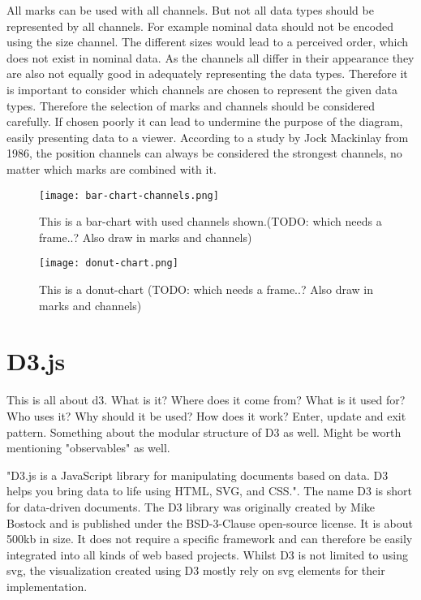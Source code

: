 All marks can be used with all channels. But not all data types should be represented by all channels. For example nominal data should not be encoded using the size channel. The different sizes would lead to a perceived order, which does not exist in nominal data. As the channels all differ in their appearance they are also not equally good in adequately representing the data types. Therefore it is important to consider which channels are chosen to represent the given data types. Therefore the selection of marks and channels should be considered carefully. If chosen poorly it can lead to undermine the purpose of the diagram, easily presenting data to a viewer. According to a study by Jock Mackinlay from 1986, the position channels can always be considered the strongest channels, no matter which marks are combined with it\cite{mackinlay1986automating}.


\begin{figure}
    \label{fig:bar-chart}
    \texttt{[image: bar-chart-channels.png]}
    \caption[bar-chart]{This is a bar-chart with used channels shown.(TODO: which needs a frame..? Also draw in marks and channels)}
\end{figure}

\begin{figure}
    \label{fig:donut-chart}
    \texttt{[image: donut-chart.png]}
    \caption[donut-chart]{This is a donut-chart (TODO: which needs a frame..? Also draw in marks and channels)}
\end{figure}

\section{D3.js}
This is all about d3. What is it? Where does it come from? What is it used for? Who uses it? Why should it be used? How does it work? Enter, update and exit pattern. Something about the modular structure of D3 as well. Might be worth mentioning "observables" as well.

"D3.js is a JavaScript library for manipulating documents based on data. D3 helps you bring data to life using HTML, SVG, and CSS."\cite{d3js}. The name D3 is short for data-driven documents. The D3 library was originally created by Mike Bostock and is published under the BSD-3-Clause open-source license. It is about 500kb in size. It does not require a specific framework and can therefore be easily integrated into all kinds of web based projects. Whilst D3 is not limited to using svg, the visualization created using D3 mostly rely on svg elements for their implementation.

